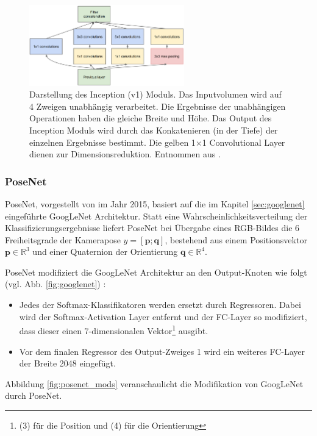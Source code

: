  \begin{figure}
	\centering
	\includegraphics[width=0.60\textwidth]{images/googlenet/inception_module.png}
	\caption{Darstellung des Inception (v1) Moduls. Das Inputvolumen wird auf 4 Zweigen unabhängig verarbeitet. Die Ergebnisse der unabhängigen Operationen haben die gleiche Breite und Höhe. Das Output des Inception Moduls wird durch das Konkatenieren (in der Tiefe) der einzelnen Ergebnisse bestimmt. Die gelben 1$\times$1 Convolutional Layer dienen zur Dimensionsreduktion. Entnommen aus \cite{szegedyGoingDeeperConvolutions2015}.}
	\label{fig:inception_module}
\end{figure}

\subsubsection{PoseNet}
\label{sec:posenet}
PoseNet, vorgestellt von \citet{kendallPoseNetConvolutionalNetwork2015} im Jahr 2015, basiert auf die im Kapitel \ref{sec:googlenet} eingeführte GoogLeNet Architektur. Statt eine Wahrscheinlichkeitsverteilung der Klassifizierungsergebnisse liefert PoseNet bei Übergabe eines RGB-Bildes die 6 Freiheitsgrade der Kamerapose $y = [\pmb{p};\pmb{q}]$, bestehend aus einem Positionsvektor $\pmb{p} \in \mathbb{R}^{3}$ und einer Quaternion der Orientierung $ \pmb{q} \in \mathbb{R}^{4}$.

PoseNet modifiziert die GoogLeNet Architektur an den Output-Knoten wie folgt (vgl. Abb. \ref{fig:googlenet}) \cite{kendallPoseNetConvolutionalNetwork2015}:
\begin{itemize}
	\item Jedes der Softmax-Klassifikatoren werden ersetzt durch Regressoren. Dabei wird der Softmax-Activation Layer entfernt und der FC-Layer so modifiziert, dass dieser einen 7-dimensionalen Vektor\footnote{(3) für die Position und (4) für die Orientierung} ausgibt.
	\item Vor dem finalen Regressor des Output-Zweiges 1 wird ein weiteres FC-Layer der Breite 2048 eingefügt.

\end{itemize}
Abbildung \ref{fig:posenet_mods} veranschaulicht die Modifikation von GoogLeNet durch PoseNet.

